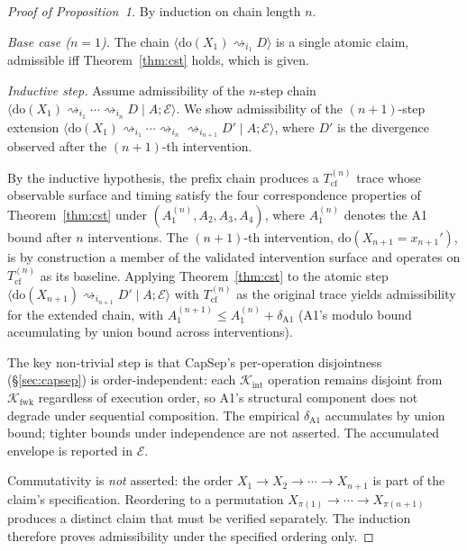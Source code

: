 \documentclass[conference]{IEEEtran}
\newcommand{\Tcf}{T_\text{cf}}
\newcommand{\Kint}{\mathcal{K}_\text{int}}
\newcommand{\Kfwk}{\mathcal{K}_\text{fwk}}
\begin{document}
\begin{proof}[Proof of Proposition~1]
By induction on chain length $n$.

\emph{Base case ($n{=}1$).} The chain
$\langle \text{do}(X_1) \rightsquigarrow_{i_1} D \rangle$ is a
single atomic claim, admissible iff Theorem~\ref{thm:cst} holds,
which is given.

\emph{Inductive step.} Assume admissibility of the
$n$-step chain
$\langle \text{do}(X_1) \rightsquigarrow_{i_1} \cdots
\rightsquigarrow_{i_n} D \mid A; \mathcal{E}\rangle$. We show
admissibility of the $(n{+}1)$-step extension
$\langle \text{do}(X_1) \rightsquigarrow_{i_1} \cdots
\rightsquigarrow_{i_n} \rightsquigarrow_{i_{n+1}} D' \mid A;
\mathcal{E}\rangle$, where $D'$ is the divergence observed after
the $(n{+}1)$-th intervention.

By the inductive hypothesis, the prefix chain produces a
$\Tcf^{(n)}$ trace whose observable surface and timing satisfy
the four correspondence properties of Theorem~\ref{thm:cst} under
$(A_1^{(n)}, A_2, A_3, A_4)$, where $A_1^{(n)}$ denotes the A1
bound after $n$ interventions. The $(n{+}1)$-th intervention,
$\text{do}(X_{n+1} = x_{n+1}')$, is by construction a member of the
validated intervention surface and operates on
$\Tcf^{(n)}$ as its baseline. Applying Theorem~\ref{thm:cst} to
the atomic step $\langle \text{do}(X_{n+1}) \rightsquigarrow_{i_{n+1}}
D' \mid A; \mathcal{E}\rangle$ with $\Tcf^{(n)}$ as the original
trace yields admissibility for the extended chain, with
$A_1^{(n+1)} \leq A_1^{(n)} + \delta_{\text{A1}}$ (A1's modulo
bound accumulating by union bound across interventions).

The key non-trivial step is that CapSep's per-operation
disjointness (\S\ref{sec:capsep}) is order-independent: each
$\Kint$ operation remains disjoint from $\Kfwk$ regardless of
execution order, so A1's structural component does not degrade
under sequential composition. The empirical $\delta_{\text{A1}}$
accumulates by union bound; tighter bounds under independence
are not asserted. The accumulated envelope is reported in
$\mathcal{E}$.

Commutativity is \emph{not} asserted: the order
$X_1 \to X_2 \to \cdots \to X_{n+1}$ is part of the claim's
specification. Reordering to a permutation $X_{\pi(1)} \to \cdots
\to X_{\pi(n+1)}$ produces a distinct claim that must be verified
separately. The induction therefore proves admissibility under
the specified ordering only.
\end{proof}
\end{document}
